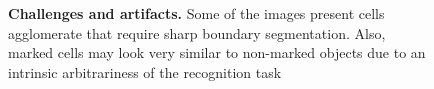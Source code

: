 \clearpage
{}
\begin{landscape}
\begin{figure}[!b]
    \centering
    \caption{\textbf{Challenges and artifacts.}
    Some of the images present cells agglomerate that require sharp boundary segmentation. 
    Also, marked cells may look very similar to non-marked objects due to an intrinsic arbitrariness of the recognition task
    }
    \label{fig:artifacts}
\end{figure}%


\end{landscape}
